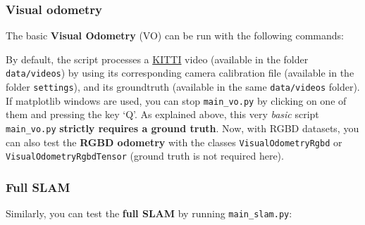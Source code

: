 \documentclass{article}
\newenvironment{Shaded}{\begin{snugshade}}{\end{snugshade}}
\newcommand{\BuiltInTok}[1]{\textcolor[rgb]{0.74,0.68,0.62}{#1}}
\newcommand{\CommentTok}[1]{\textcolor[rgb]{0.00,0.40,1.00}{\textbf{\textit{#1}}}}
\newcommand{\ExtensionTok}[1]{\textcolor[rgb]{0.74,0.68,0.62}{#1}}
\newcommand{\NormalTok}[1]{\textcolor[rgb]{0.74,0.68,0.62}{#1}}
\begin{document}
\hypertarget{visual-odometry}{%
\subsubsection{Visual odometry}\label{visual-odometry}}

The basic \textbf{Visual Odometry} (VO) can be run with the following
commands:

\begin{scriptsize}
\begin{Shaded}
\end{Shaded}
\end{scriptsize}


By default, the script processes a
\href{http://www.cvlibs.net/datasets/kitti/eval_odometry.php}{KITTI}
video (available in the folder \texttt{data/videos}) by using its
corresponding camera calibration file (available in the folder
\texttt{settings}), and its groundtruth (available in the same
\texttt{data/videos} folder). If matplotlib windows are used, you can
stop \texttt{main\_vo.py} by clicking on one of them and
pressing the key `Q'. As explained above, this very \emph{basic} script
\texttt{main\_vo.py} \textbf{strictly requires a ground truth}. Now,
with RGBD datasets, you can also test the \textbf{RGBD odometry} with
the classes \texttt{VisualOdometryRgbd} or
\texttt{VisualOdometryRgbdTensor} (ground truth is not required here).

\hypertarget{full-slam}{%
\subsubsection{Full SLAM}\label{full-slam}}

Similarly, you can test the \textbf{full SLAM} by running
\texttt{main\_slam.py}:\\

\begin{scriptsize}
\begin{Shaded}
\end{Shaded}
\end{scriptsize}
\end{document}
